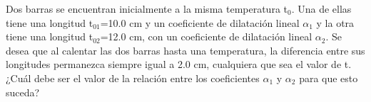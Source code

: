 
Dos barras se encuentran inicialmente a la misma temperatura t$_0$. Una de ellas tiene una longitud t$_{01}$=10.0 cm y un coeficiente de dilatación lineal $\alpha_1$ y la otra tiene una longitud t$_{02}$=12.0 cm, con un coeficiente de dilatación lineal $\alpha_2$. Se desea que al calentar las dos barras hasta una temperatura, la diferencia entre sus longitudes permanezca siempre igual a 2.0 cm, cualquiera que sea el valor de t. ¿Cuál debe ser el valor de la relación entre los coeficientes $\alpha_1$ y $\alpha_2$ para que esto suceda?